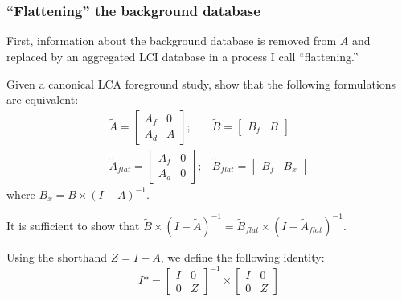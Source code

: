 \subsubsection{``Flattening'' the background database}

First, information about the background database is removed from $\tilde{A}$ and replaced by an aggregated LCI database in a process I call ``flattening.''

Given a canonical LCA foreground study, show that the following formulations are equivalent:
\begin{eqnarray}
\tilde{A} = \left[\begin{array}{cc}
A_f & 0 \\
A_d &  A
  \end{array}
\right];&
  \tilde{B} = \left[\begin{array}{cc} B_f & B   \end{array}\right] \\
 \tilde{A}_{flat} = \left[\begin{array}{cc} 
A_f &  0 \\
A_d & 0 
   \end{array}\right];&  \tilde{B}_{flat} = \left[\begin{array}{cc} B_f & B_x \end{array}\right ]
\end{eqnarray}
where $B_x = B\times(I-A)^{-1}$.

It is sufficient to show that $\tilde{B}\times(I-\tilde{A})^{-1} = \tilde{B}_{flat}\times(I-\tilde{A}_{flat})^{-1}$.

Using the shorthand $Z=I-A$, we define the following identity:
\begin{equation}
  I* = \left[\begin{array}{cc}
      I & 0 \\
      0 & Z
    \end{array}\right]^{-1} \times
  \left[\begin{array}{cc}
      I & 0 \\
      0 & Z
    \end{array}\right]
\end{equation}

